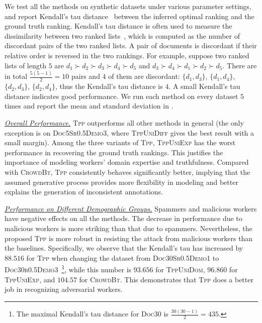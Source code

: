 We test all the methods on synthetic datasets under various parameter settings,
and report Kendall's tau distance~\cite{kendall1938new}  between the inferred
optimal ranking and the ground truth ranking.  Kendall's tau distance is often
used to measure the dissimilarity between two ranked
lists~\cite{klementiev2008unsupervised}, which is computed as the number of
discordant pairs of the two ranked lists. A pair of documents is discordant if
their relative order is reversed in the two rankings.  For example, suppose two
ranked lists of length $5$ are $d_1 \succ d_2 \succ d_3 \succ d_4 \succ d_5$ and
$d_3\succ d_4 \succ d_1 \succ d_2 \succ d_5$. There are in total
$\frac{5(5-1)}{2}=10$ pairs and $4$ of them are discordant: $\{d_1, d_3\}$,
$\{d_1, d_4\}$, $\{d_2, d_3\}$, $\{d_2, d_4\}$,  thus the Kendall's tau distance
is $4$.  A small Kendall's tau distance indicates good performance. We run each
method on every dataset $5$ times and report the mean and standard deviation in
.

\noindent\underline{\emph{Overall Performance.}} \textsc{Tpp} outperforms all
other methods in general (the only exception is on \textsc{Doc5Sr0.5Demo3},
where \textsc{TppUniDiff} gives the best result with a small margin).  Among the
three variants of \textsc{Tpp}, \textsc{TppUniExp} has the worst performance in
recovering the ground truth rankings. This justifies the importance of modeling
workers' domain expertise and truthfulness. Compared with \textsc{CrowdBt},
\textsc{Tpp} consistently behaves significantly better, implying that the
assumed generative process provides more flexibility in modeling and better
explains the generation of inconsistent annotations.

\noindent\underline{\emph{Performance on Different Demographic Groups.}}
Spammers and malicious workers have negative effects on all the methods. The
decrease in performance due to malicious workers is  more striking than that due
to spammers.  Nevertheless, the proposed \textsc{Tpp} is more robust in
resisting the attack from malicious workers than the baselines.  Specifically,
we observe that the Kendall's tau has increased by $88.516$ for \textsc{Tpp}
when changing the dataset from \textsc{Doc30Sr0.5Demo1} to
\textsc{Doc30r0.5Demo3}~\footnote{The maximal Kendall's tau distance for
\textsc{Doc30} is $\frac{30(30-1)}{2} = 435$.}, while this number is $93.656$
for \textsc{TppUniDom}, $96.860$ for \textsc{TppUniExp}, and $104.57$ for
\textsc{CrowdBt}. This demonstrates that \textsc{Tpp} does a better job in
recognizing adversarial workers.

